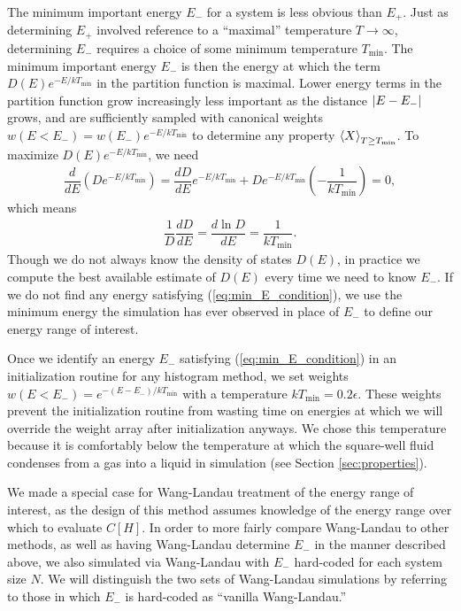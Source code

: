 \documentclass[11pt]{article}
\newcommand{\bk}{\Braket} %
\renewcommand{\t}{\text} %
\newcommand{\f}[2]{\dfrac{#1}{#2}} %
\newcommand{\p}[1]{\left(#1\right)} %
\renewcommand{\sp}[1]{\left[#1\right]} %
\begin{document}
The minimum important energy $E_-$ for a system is less obvious than
$E_+$. Just as determining $E_+$ involved reference to a ``maximal''
temperature $T\to\infty$, determining $E_-$ requires a choice of some
minimum temperature $T_{\t{min}}$. The minimum important energy $E_-$
is then the energy at which the term $D\p{E}e^{-E/kT_{\t{min}}}$ in
the partition function is maximal. Lower energy terms in the partition
function grow increasingly less important as the distance
$\left|E-E_-\right|$ grows, and are sufficiently sampled with canonical
weights $w\p{E<E_-}=w\p{E_-}e^{-E/kT_{\t{min}}}$ to determine any
property $\bk{X}_{T\ge T_{\t{min}}}$. To maximize
$D\p{E}e^{-E/kT_{\t{min}}}$, we need
\begin{align}
  \f{d}{dE}\p{De^{-E/kT_{\t{min}}}}
  =\f{dD}{dE}e^{-E/kT_{\t{min}}}+De^{-E/kT_{\t{min}}}\p{-\f{1}{kT_{\t{min}}}}=0,
  \label{eq:min_E_setup}
\end{align}
which means
\begin{align}
  \f1{D}\f{dD}{dE}=\f{d\ln D}{dE}=\f{1}{kT_{\t{min}}}.
  \label{eq:min_E_condition}
\end{align}
Though we do not always know the density of states $D\p{E}$, in
practice we compute the best available estimate of $D\p{E}$ every time
we need to know $E_-$. If we do not find any energy satisfying
(\ref{eq:min_E_condition}), we use the minimum energy the simulation
has ever observed in place of $E_-$ to define our energy range of
interest.

Once we identify an energy $E_-$ satisfying (\ref{eq:min_E_condition})
in an initialization routine for any histogram method, we set weights
$w\p{E<E_-}=e^{-\p{E-E_-}/kT_{\t{min}}}$ with a temperature
$kT_{\t{min}}=0.2\epsilon$. These weights prevent the initialization
routine from wasting time on energies at which we will override the
weight array after initialization anyways. We chose this temperature
because it is comfortably below the temperature at which the
square-well fluid condenses from a gas into a liquid in simulation
(see Section \ref{sec:properties}).

We made a special case for Wang-Landau treatment of the energy range
of interest, as the design of this method assumes knowledge of the
energy range over which to evaluate $C\sp{H}$. In order to more fairly
compare Wang-Landau to other methods, as well as having Wang-Landau
determine $E_-$ in the manner described above, we also simulated via
Wang-Landau with $E_-$ hard-coded for each system size $N$. We will
distinguish the two sets of Wang-Landau simulations by referring to
those in which $E_-$ is hard-coded as ``vanilla Wang-Landau.''
\end{document}
